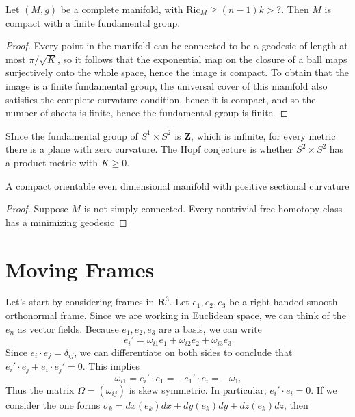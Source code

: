 \begin{corollary}
    Let $(M,g)$ be a complete manifold, with $\text{Ric}_M \geq (n-1)k > ?$. Then $M$ is compact with a finite fundamental group.
\end{corollary}
\begin{proof}
    Every point in the manifold can be connected to be a geodesic of length at most $\pi/\sqrt{K}$, so it follows that the exponential map on the closure of a ball maps surjectively onto the whole space, hence the image is compact. To obtain that the image is a finite fundamental group, the universal cover of this manifold also satisfies the complete curvature condition, hence it is compact, and so the number of sheets is finite, hence the fundamental group is finite.
\end{proof}

\begin{example}
    SInce the fundamental group of $S^1 \times S^2$ is $\mathbf{Z}$, which is infinite, for every metric there is a plane with zero curvature. The Hopf conjecture is whether $S^2 \times S^2$ has a product metric with $K \geq 0$.
\end{example}

\begin{theorem}[Synge]
    A compact orientable even dimensional manifold with positive sectional curvature
\end{theorem}
\begin{proof}
    Suppose $M$ is not simply connected. Every nontrivial free homotopy class has a minimizing geodesic
\end{proof}





\chapter{Moving Frames}

Let's start by considering frames in $\mathbf{R}^3$. Let $e_1, e_2, e_3$ be a right handed smooth orthonormal frame. Since we are working in Euclidean space, we can think of the $e_n$ as vector fields. Because $e_1, e_2, e_3$ are a basis, we can write
%
\[ e_i' = \omega_{i1} e_1 + \omega_{i2} e_2 + \omega_{i3} e_3 \]
%
Since $e_i \cdot e_j = \delta_{ij}$, we can differentiate on both sides to conclude that $e_i' \cdot e_j + e_i \cdot e_j' = 0$. This implies
%
\[ \omega_{i1} = e_i' \cdot e_1 = - e_1' \cdot e_i = - \omega_{1i} \]
%
Thus the matrix $\Omega = (\omega_{ij})$ is skew symmetric. In particular, $e_i' \cdot e_i = 0$. If we consider the one forms $\sigma_k = dx(e_k) dx + dy(e_k) dy + dz(e_k) dz$, then






